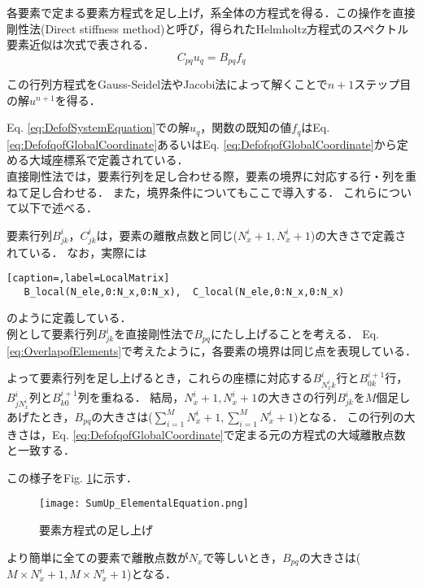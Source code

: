 \documentclass[12pt,a4paper]{jsarticle}
\begin{document}
各要素で定まる要素方程式を足し上げ，系全体の方程式を得る．この操作を直接剛性法(Direct stiffness method)と呼び，得られたHelmholtz方程式のスペクトル要素近似は次式で表される．
\begin{equation}
  C_{pq} u_{q} = B_{pq} f_{q}
  \label{eq:DefofSystemEquation}
\end{equation}

この行列方程式をGauss-Seidel法やJacobi法によって解くことで$n+1$ステップ目の解$u^{n+1}$を得る．

Eq. \ref{eq:DefofSystemEquation}での解$u_{q}$，関数の既知の値$f_{q}$はEq. \ref{eq:DefofqofGlobalCoordinate}あるいはEq. \ref{eq:DefofqofGlobalCoordinate}から定める大域座標系で定義されている．\\

直接剛性法では，要素行列を足し合わせる際，要素の境界に対応する行・列を重ねて足し合わせる．
また，境界条件についてもここで導入する．
これらについて以下で述べる．

要素行列$B_{jk}^i$，$C_{jk}^i$は，要素の離散点数と同じ($N_{x}^i +1, N_{x}^i +1$)の大きさで定義されている．
なお，実際には
\begin{lstlisting}[caption=,label=LocalMatrix]
   B_local(N_ele,0:N_x,0:N_x),  C_local(N_ele,0:N_x,0:N_x)
\end{lstlisting}
のように定義している．\\

例として要素行列$B_{jk}^i$を直接剛性法で$B_{pq}$にたし上げることを考える．
Eq. \ref{eq:OverlapofElements}で考えたように，各要素の境界は同じ点を表現している．

よって要素行列を足し上げるとき，これらの座標に対応する$B_{N_{x}^i k}^i$行と$B_{0 k}^{i+1}$行，$B_{j N_{x}^i}^i$列と$B_{k 0}^{i+1}$列を重ねる．
結局，$N_{x}^i +1, N_{x}^i +1$の大きさの行列$B_{jk}^i$を$M$個足しあげたとき，$B_{pq}$の大きさは($\sum_{i=1}^{M}N_{x}^i +1, \sum_{i=1}^{M}N_{x}^i +1$)となる．
この行列の大きさは，Eq. \ref{eq:DefofqofGlobalCoordinate}で定まる元の方程式の大域離散点数と一致する．

この様子をFig. \ref{fig:SumUp_ElementalEquation}に示す．
\begin{figure}[h]
  \centering
  \texttt{[image: SumUp\_ElementalEquation.png]}
  \caption{要素方程式の足し上げ}
  \label{fig:SumUp_ElementalEquation}
\end{figure}

より簡単に全ての要素で離散点数が$N_{x}$で等しいとき，$B_{pq}$の大きさは($M\times N_{x}^i +1, M\times N_{x}^i +1$)となる．\\
\end{document}
